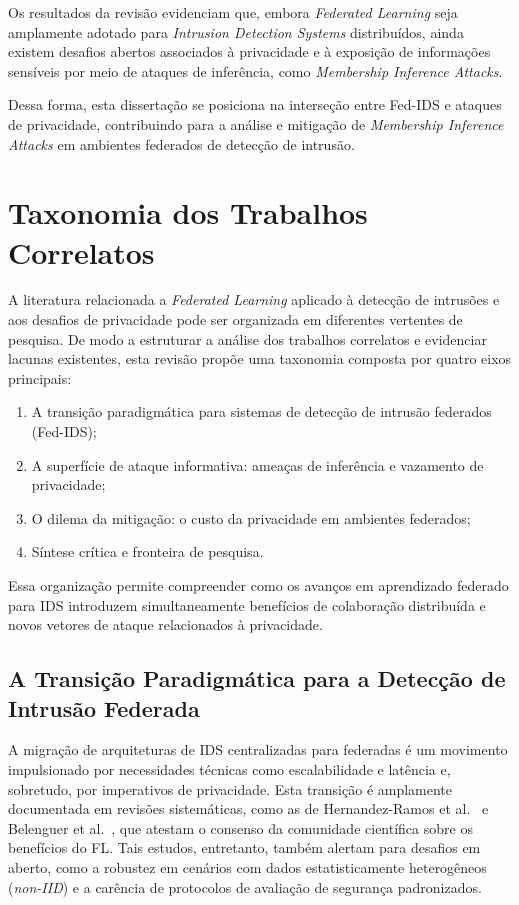 \documentclass[
	12pt,				%
	openright,			%
	oneside,			%
	a4paper,			%
	english,			%
	french,				%
	spanish,			%
	brazil,				%
	]{abntex2}
\begin{document}
Os resultados da revisão evidenciam que, embora \textit{Federated Learning} seja amplamente
adotado para \textit{Intrusion Detection Systems} distribuídos, ainda existem desafios abertos
associados à privacidade e à exposição de informações sensíveis por meio de ataques de
inferência, como \textit{Membership Inference Attacks}.

Dessa forma, esta dissertação se posiciona na interseção entre Fed-IDS e ataques de
privacidade, contribuindo para a análise e mitigação de \textit{Membership Inference Attacks} em
ambientes federados de detecção de intrusão.

\section{Taxonomia dos Trabalhos Correlatos}
\label{sec:taxonomia}

A literatura relacionada a \textit{Federated Learning} aplicado à detecção de intrusões e aos
desafios de privacidade pode ser organizada em diferentes vertentes de pesquisa.
De modo a estruturar a análise dos trabalhos correlatos e evidenciar lacunas existentes,
esta revisão propõe uma taxonomia composta por quatro eixos principais:

\begin{enumerate}
    \item A transição paradigmática para sistemas de detecção de intrusão federados (Fed-IDS);
    \item A superfície de ataque informativa: ameaças de inferência e vazamento de privacidade;
    \item O dilema da mitigação: o custo da privacidade em ambientes federados;
    \item Síntese crítica e fronteira de pesquisa.
\end{enumerate}

Essa organização permite compreender como os avanços em aprendizado federado para IDS
introduzem simultaneamente benefícios de colaboração distribuída e novos vetores de ataque
relacionados à privacidade.

\subsection{A Transição Paradigmática para a Detecção de Intrusão Federada}

A migração de arquiteturas de IDS centralizadas para federadas é um movimento impulsionado por necessidades técnicas como escalabilidade e latência  e, sobretudo, por imperativos de privacidade. Esta transição é amplamente documentada em revisões sistemáticas, como as de Hernandez-Ramos et al.~\cite{hernandez2023surveyfedids} e Belenguer et al.~\cite{belenguer2025surveyfedids}, que atestam o consenso da comunidade científica sobre os benefícios do FL. Tais estudos, entretanto, também alertam para desafios em aberto, como a robustez em cenários com dados estatisticamente heterogêneos (\textit{non-IID}) e a carência de protocolos de avaliação de segurança padronizados.
\end{document}
